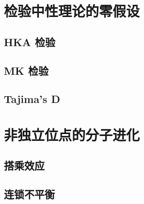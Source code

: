 \documentclass[12pt]{article}
\begin{document}
\section{检验中性理论的零假设}

\subsection{HKA 检验}

\subsection{MK 检验}

\subsection{Tajima’s D}

\section{非独立位点的分子进化}

\subsection{搭乘效应}

\subsection{连锁不平衡}
\end{document}

